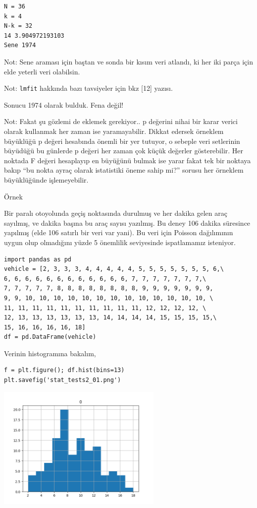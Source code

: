 \documentclass[12pt,fleqn]{article}\usepackage{../../common}
\begin{document}
\begin{verbatim}
N = 36
k = 4
N-k = 32
14 3.904972193103
Sene 1974
\end{verbatim}

Not: Sene araması için baştan ve sonda bir kısım veri atlandı, ki her iki
parça için elde yeterli veri olabilsin. 

Not: \verb!lmfit! hakkında bazı tavsiyeler için bkz [12] yazısı.

Sonucu 1974 olarak bulduk. Fena değil!

Not: Fakat şu gözlemi de eklemek gerekiyor.. p değerini nihai bir karar verici
olarak kullanmak her zaman ise yaramayabilir. Dikkat edersek örneklem büyüklüğü
p değeri hesabında önemli bir yer tutuyor, o sebeple veri setlerinin büyüdüğü bu
günlerde p değeri her zaman çok küçük değerler gösterebilir. Her noktada F
değeri hesaplayıp en büyüğünü bulmak ise yarar fakat tek bir noktaya bakıp
``bu nokta ayraç olarak istatistiki öneme sahip mi?'' sorusu her örneklem
büyüklüğünde işlemeyebilir. 

Örnek

Bir paralı otoyolunda geçiş noktasında durulmuş ve her dakika gelen araç
sayılmış, ve dakika başına bu araç sayısı yazılmış. Bu deney 106 dakika
süresince yapılmış (elde 106 satırlı bir veri var yani). Bu veri için
Poisson dağılımının uygun olup olmadığını yüzde 5 önemlilik seviyesinde
ispatlamamız isteniyor.

\begin{verbatim}
import pandas as pd
vehicle = [2, 3, 3, 3, 4, 4, 4, 4, 4, 5, 5, 5, 5, 5, 5, 5, 6,\
6, 6, 6, 6, 6, 6, 6, 6, 6, 6, 6, 6, 7, 7, 7, 7, 7, 7, 7,\
7, 7, 7, 7, 7, 8, 8, 8, 8, 8, 8, 8, 8, 9, 9, 9, 9, 9, 9, 9,
9, 9, 10, 10, 10, 10, 10, 10, 10, 10, 10, 10, 10, 10, 10, \
11, 11, 11, 11, 11, 11, 11, 11, 11, 11, 12, 12, 12, 12, \
12, 13, 13, 13, 13, 13, 13, 14, 14, 14, 14, 15, 15, 15, 15,\
15, 16, 16, 16, 16, 18]
df = pd.DataFrame(vehicle)
\end{verbatim}

Verinin histogramına bakalım,

\begin{verbatim}
f = plt.figure(); df.hist(bins=13)
plt.savefig('stat_tests2_01.png')
\end{verbatim}

\includegraphics[height=6cm]{stat_tests2_01.png}
\end{document}
